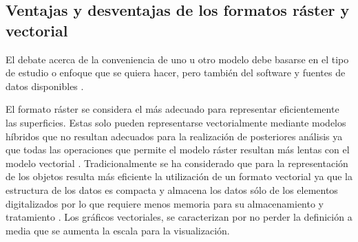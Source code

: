 \subsection{Ventajas y desventajas de los formatos ráster y vectorial}

El debate acerca de la conveniencia de uno u otro modelo debe basarse en el tipo de estudio o
enfoque que se quiera hacer, pero también del software y fuentes de datos disponibles
\cite{fAlonsoSig2006}.

El formato ráster se considera el más adecuado para representar eficientemente las superficies.
Estas solo pueden representarse vectorialmente mediante modelos híbridos que no resultan adecuados
para la realización de posteriores análisis ya que todas las operaciones que permite el modelo
ráster resultan más lentas con el modelo vectorial \cite{fAlonsoSig2006}. Tradicionalmente se ha
considerado que para la representación de los objetos resulta más eficiente la utilización de un
formato vectorial ya que la estructura de los datos es compacta y almacena los datos sólo de los
elementos digitalizados por lo que requiere menos memoria para su almacenamiento y tratamiento
\cite{fAlonsoSig2006}. Los gráficos vectoriales, se caracterizan por no perder la definición a
media que se aumenta la escala para la visualización.

